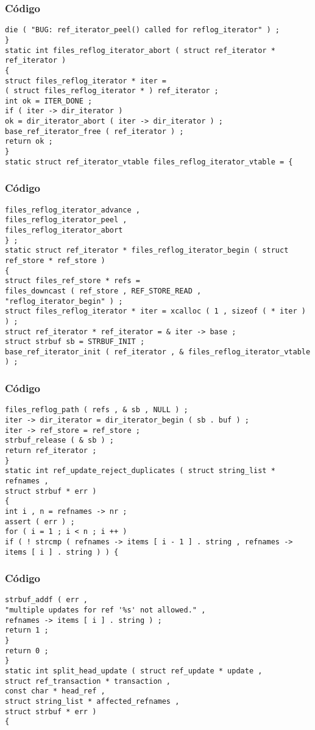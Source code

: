 \documentclass{beamer}
\begin{document}
\begin{frame}[fragile]
\frametitle{C\'odigo}
\begin{verbatim}
die ( "BUG: ref_iterator_peel() called for reflog_iterator" ) ; 
} 
static int files_reflog_iterator_abort ( struct ref_iterator * ref_iterator ) 
{ 
struct files_reflog_iterator * iter = 
( struct files_reflog_iterator * ) ref_iterator ; 
int ok = ITER_DONE ; 
if ( iter -> dir_iterator ) 
ok = dir_iterator_abort ( iter -> dir_iterator ) ; 
base_ref_iterator_free ( ref_iterator ) ; 
return ok ; 
} 
static struct ref_iterator_vtable files_reflog_iterator_vtable = { 
\end{verbatim}
\end{frame}
\begin{frame}[fragile]
\frametitle{C\'odigo}
\begin{verbatim}
files_reflog_iterator_advance , 
files_reflog_iterator_peel , 
files_reflog_iterator_abort 
} ; 
static struct ref_iterator * files_reflog_iterator_begin ( struct ref_store * ref_store ) 
{ 
struct files_ref_store * refs = 
files_downcast ( ref_store , REF_STORE_READ , 
"reflog_iterator_begin" ) ; 
struct files_reflog_iterator * iter = xcalloc ( 1 , sizeof ( * iter ) ) ; 
struct ref_iterator * ref_iterator = & iter -> base ; 
struct strbuf sb = STRBUF_INIT ; 
base_ref_iterator_init ( ref_iterator , & files_reflog_iterator_vtable ) ; 
\end{verbatim}
\end{frame}
\begin{frame}[fragile]
\frametitle{C\'odigo}
\begin{verbatim}
files_reflog_path ( refs , & sb , NULL ) ; 
iter -> dir_iterator = dir_iterator_begin ( sb . buf ) ; 
iter -> ref_store = ref_store ; 
strbuf_release ( & sb ) ; 
return ref_iterator ; 
} 
static int ref_update_reject_duplicates ( struct string_list * refnames , 
struct strbuf * err ) 
{ 
int i , n = refnames -> nr ; 
assert ( err ) ; 
for ( i = 1 ; i < n ; i ++ ) 
if ( ! strcmp ( refnames -> items [ i - 1 ] . string , refnames -> items [ i ] . string ) ) { 
\end{verbatim}
\end{frame}
\begin{frame}[fragile]
\frametitle{C\'odigo}
\begin{verbatim}
strbuf_addf ( err , 
"multiple updates for ref '%s' not allowed." , 
refnames -> items [ i ] . string ) ; 
return 1 ; 
} 
return 0 ; 
} 
static int split_head_update ( struct ref_update * update , 
struct ref_transaction * transaction , 
const char * head_ref , 
struct string_list * affected_refnames , 
struct strbuf * err ) 
{ 
\end{verbatim}
\end{frame}
\end{document}
